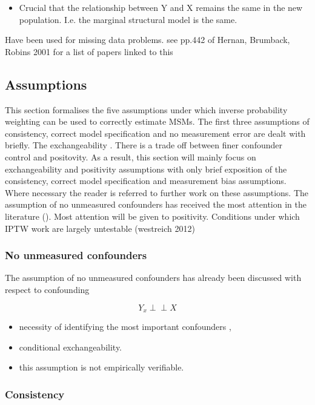 \documentclass[11pt]{article}
\providecommand{\tightlist}{%
      \setlength{\itemsep}{0pt}\setlength{\parskip}{0pt}}
\begin{document}
\begin{itemize}
\tightlist
\item
  Crucial that the relationship between Y and X remains the same in the
  new population. I.e. the marginal structural model is the same.
\end{itemize}

Have been used for missing data problems. see pp.442 of Hernan,
Brumback, Robins 2001 for a list of papers linked to this

    \subsection{Assumptions}\label{assumptions}

This section formalises the five assumptions under which inverse
probability weighting can be used to correctly estimate MSMs. The first
three assumptions of consistency, correct model specification and no
measurement error are dealt with briefly. The exchangeability . There is
a trade off between finer confounder control and positovity. As a
result, this section will mainly focus on exchangeability and positivity
assumptions with only brief exposition of the consistency, correct model
specification and measurement bias assumptions. Where necessary the
reader is referred to further work on these assumptions. The assumption
of no unmeasured confounders has received the most attention in the
literature (). Most attention will be given to positivity. Conditions
under which IPTW work are largely untestable (westreich 2012)

\subsubsection{No unmeasured
confounders}\label{no-unmeasured-confounders}

The assumption of no unmeasured confounders has already been discussed
with respect to confounding

\[Y_{x} \perp\!\!\!\perp X\]

\begin{itemize}
\tightlist
\item
  necessity of identifying the most important confounders \citet{},
  \citet{}
\item
  conditional exchangeability.
\item
  this assumption is not empirically verifiable.
\end{itemize}

\subsubsection{Consistency}\label{consistency}
\end{document}
